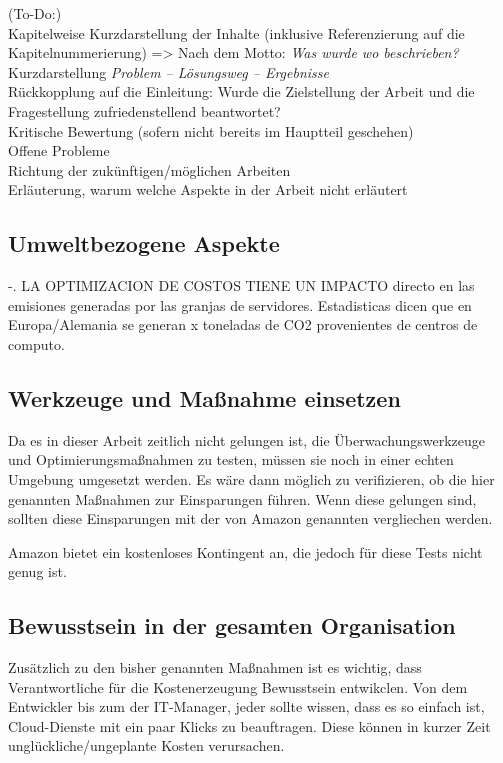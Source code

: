 (To-Do:)
\\Kapitelweise Kurzdarstellung der Inhalte (inklusive Referenzierung auf die \\Kapitelnummerierung) => Nach dem Motto: \textit{Was wurde wo beschrieben?}
\\Kurzdarstellung \textit{Problem – Lösungsweg – Ergebnisse}
\\Rückkopplung auf die Einleitung: Wurde die Zielstellung der Arbeit und die \\Fragestellung zufriedenstellend beantwortet?
\\Kritische Bewertung (sofern nicht bereits im Hauptteil geschehen)
\\Offene Probleme
\\Richtung der zukünftigen/möglichen Arbeiten
\\Erläuterung, warum welche Aspekte in der Arbeit nicht erläutert 

\subsection{Umweltbezogene Aspekte}
-. LA OPTIMIZACION DE COSTOS TIENE UN IMPACTO directo en las emisiones generadas por las granjas de servidores. 
Estadisticas dicen que en Europa/Alemania se generan x toneladas de CO2 provenientes de centros de computo.
\\
\subsection{Werkzeuge und Maßnahme einsetzen}
Da es in dieser Arbeit zeitlich nicht gelungen ist, die Überwachungswerkzeuge und Optimierungsmaßnahmen zu testen, müssen sie noch in einer echten Umgebung umgesetzt werden. Es wäre dann möglich zu verifizieren, ob die hier genannten Maßnahmen zur Einsparungen führen. Wenn diese gelungen sind, sollten diese Einsparungen mit der von Amazon genannten vergliechen werden.

Amazon bietet ein kostenloses Kontingent an, die jedoch für diese Tests nicht genug ist. 
\\
\subsection{Bewusstsein in der gesamten Organisation}
Zusätzlich zu den bisher genannten Maßnahmen ist es wichtig, dass Verantwortliche für die Kostenerzeugung Bewusstsein entwikclen. Von dem Entwickler bis zum der IT-Manager, jeder sollte wissen, dass es so einfach ist, Cloud-Dienste mit ein paar Klicks zu beauftragen. Diese können in kurzer Zeit unglückliche/ungeplante Kosten verursachen. 
\\
